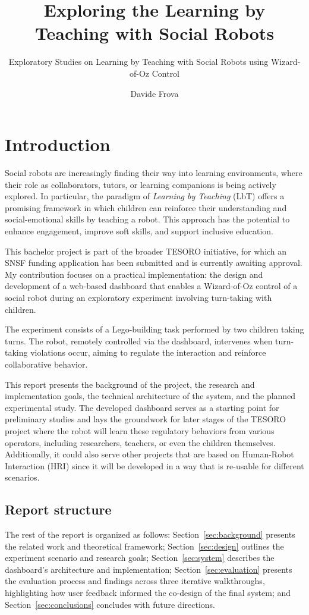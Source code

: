 \documentclass[a4paper]{usiinfbachelorproject}
\author{Davide Frova}
\title{\textbf{Exploring the Learning by Teaching with Social Robots}}
\subtitle{Exploratory Studies on Learning by Teaching with Social Robots using Wizard-of-Oz Control}
\begin{document}
\maketitle
\tableofcontents\newpage

\section{\textbf{Introduction}}

Social robots are increasingly finding their way into learning environments, where their role as collaborators, tutors, or learning companions is being actively explored. In particular, the paradigm of \textit{Learning by Teaching} (LbT) offers a promising framework in which children can reinforce their understanding and social-emotional skills by teaching a robot. This approach has the potential to enhance engagement, improve soft skills, and support inclusive education.

This bachelor project is part of the broader TESORO initiative, for which an SNSF funding application has been submitted and is currently awaiting approval. My contribution focuses on a practical implementation: the design and development of a web-based dashboard that enables a Wizard-of-Oz control of a social robot during an exploratory experiment involving turn-taking with children.

The experiment consists of a Lego-building task performed by two children taking turns. The robot, remotely controlled via the dashboard, intervenes when turn-taking violations occur, aiming to regulate the interaction and reinforce collaborative behavior.

This report presents the background of the project, the research and implementation goals, the technical architecture of the system, and the planned experimental study.
The developed dashboard serves as a starting point for preliminary studies and lays the groundwork for later stages of the TESORO project where the robot will learn these regulatory behaviors from various operators, including researchers, teachers, or even the children themselves. Additionally, it could also serve other projects that are based on Human-Robot Interaction (HRI) since it will be developed in a way that is re-usable for different scenarios.

\subsection{\textbf{Report structure}}
The rest of the report is organized as follows: Section~\ref{sec:background} presents the related work and theoretical framework; Section~\ref{sec:design} outlines the experiment scenario and research goals; Section~\ref{sec:system} describes the dashboard's architecture and implementation; Section~\ref{sec:evaluation} presents the evaluation process and findings across three iterative walkthroughs, highlighting how user feedback informed the co-design of the final system; and Section~\ref{sec:conclusions} concludes with future directions.
\end{document}
